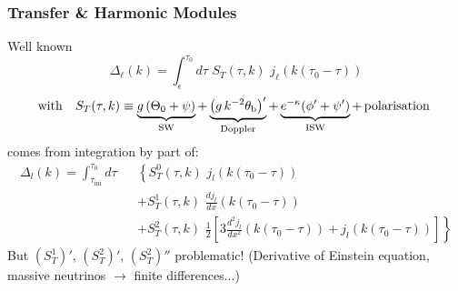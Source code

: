 \begin{frame}[fragile]
\frametitle{Transfer \& Harmonic Modules}

Well known
$$\Delta_\ell (k) = \int_{\epsilon}^{\tau_0} d \tau \,\, S_T(\tau,k) \,\, j_\ell(k(\tau_0-\tau))$$
$${\rm with}~~~S_T(\tau,k) \equiv \mathop{\underbrace{g\left(\Theta_0 + \psi\right)}}_\mathrm{SW} 
+ \mathop{\underbrace{\left(g \, k^{-2} \theta_\mathrm{b}\right)'}}_\mathrm{Doppler}  
+ \mathop{\underbrace{e^{-\kappa} (\phi'+\psi')}}_\mathrm{ISW} + \, \mathrm{polarisation}~$$
comes from integration by part of:
\begin{eqnarray}
\Delta_l (k) = \int_{\tau_\mathrm{ini}}^{\tau_0} d \tau \!\!\!\!\!\!\!\!\!\!\!\!&& \left\{  S_T^0(\tau,k) \,\, j_l(k(\tau_0-\tau))\right. \nonumber \\
&& + S_T^1(\tau,k) \,\, \frac{d j_l}{dx}(k(\tau_0-\tau)) \nonumber \\
&&\left. + S_T^2(\tau,k) \,\, \frac{1}{2}\left[3 \frac{d^2 j_l}{dx^2}(k(\tau_0-\tau)) + j_l(k(\tau_0-\tau)) \right]\right\} \nonumber
\end{eqnarray}
But $(S_T^1)'$, $(S_T^2)'$, $(S_T^2)''$ problematic! (Derivative of Einstein equation, massive neutrinos $\rightarrow$ finite differences...)

\end{frame}



